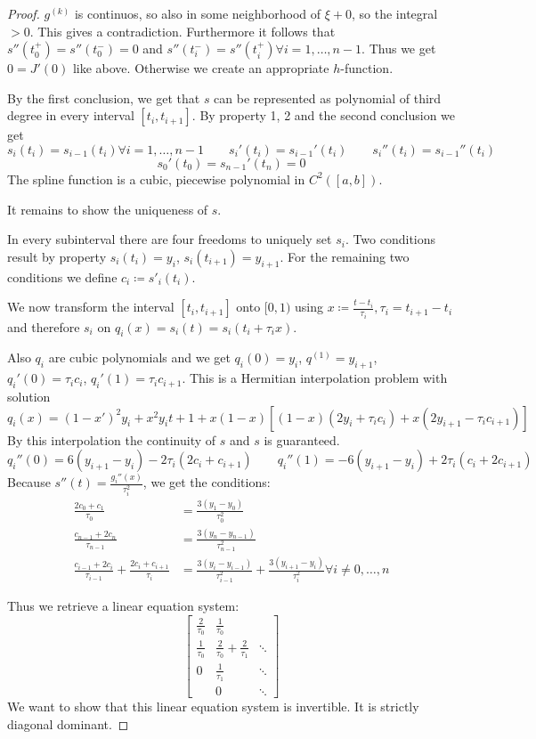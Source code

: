 \documentclass[a4paper]{article}
\numberwithin{lecref}{section}
\theoremstyle{break}
\begin{document}
\begin{proof}
  $g^{(k)}$ is continuos, so also in some neighborhood of $\xi + 0$, so the integral $> 0$. This gives a contradiction.
  Furthermore it follows that $s''(t_0^+) = s''(t_0^-) = 0$ and $s''(t_i^-) = s''(t_i^+) \forall i = 1, \dots, n-1$.
  Thus we get $0 = J'(0)$ like above. Otherwise we create an appropriate $h$-function.

  By the first conclusion, we get that $s$ can be represented as polynomial of third degree in every interval $[t_i, t_{i+1}]$. By property 1, 2 and the second conclusion we get
  \[
    s_i(t_i) = s_{i-1}(t_i) \forall i = 1, \dots, n-1 \qquad
    s_i'(t_i) = s_{i-1}'(t_i) \qquad
    s_i''(t_i) = s_{i-1}''(t_i)
  \]
  \[ s_0'(t_0) = s_{n-1}'(t_n) = 0 \]
  The spline function is a cubic, piecewise polynomial in $C^2([a, b])$.

  It remains to show the uniqueness of $s$.

  In every subinterval there are four freedoms to uniquely set $s_i$.
  Two conditions result by property $s_i(t_i) = y_i$, $s_i(t_{i+1}) = y_{i+1}$.
  For the remaining two conditions we define $c_i \coloneqq s'_i(t_i)$.

  We now transform the interval $[t_i, t_{i+1}]$ onto $[0,1)$ using $x \coloneqq \frac{t - t_i}{\tau_i}, \tau_i = t_{i + 1} - t_i$ and therefore $s_i$ on $q_i(x) = s_i(t) = s_i(t_i + \tau_i x)$.

  Also $q_i$ are cubic polynomials and we get $q_i(0) = y_i$, $q^{(1)} = y_{i+1}$, $q_i'(0) = \tau_i c_i$, $q_i'(1) = \tau_i c_{i+1}$. This is a Hermitian interpolation problem with solution
  \[ q_i(x) = (1 - x')^2 y_i + x^2 y_i t + 1 + x(1 - x) [(1 - x)(2y_i + \tau_i c_i) + x(2y_{i+1} - \tau_i c_{i+1})] \]
  By this interpolation the continuity of $s$ and $s$ is guaranteed.
  \[ q_i''(0) = 6(y_{i+1} - y_i) - 2\tau_i (2 c_i + c_{i+1}) \qquad q_i''(1) = -6(y_{i+1} - y_i) + 2\tau_i(c_i + 2 c_{i+1}) \]
  Because $s''(t) = \frac{g_i''(x)}{\tau_i^2}$, we get the conditions:
  \begin{align*}
    \frac{2c_0 + c_1}{\tau_0} &= \frac{3(y_1 - y_0)}{\tau_0^2} \\
    \frac{c_{n-1} + 2c_n}{\tau_{n-1}} &= \frac{3(y_n - y_{n-1})}{\tau_{n-1}^2} \\
    \frac{c_{i-1} + 2c_i}{\tau_{i-1}} + \frac{2c_i + c_{i+1}}{\tau_i} &= \frac{3(y_i - y_{i-1})}{\tau_{i-1}^2} + \frac{3(y_{i+1} - y_i)}{\tau_i^2} \forall i \neq 0, \dots, n
  \end{align*}

  Thus we retrieve a linear equation system:
  \[
    \begin{bmatrix}
      \frac{2}{\tau_0} & \frac{1}{\tau_0}                    & \\
      \frac{1}{\tau_0} & \frac{2}{\tau_0} + \frac{2}{\tau_1} & \ddots \\
      0                & \frac{1}{\tau_1}                    & \ddots \\
                       & 0                                   & \ddots
    \end{bmatrix}
  \]
  We want to show that this linear equation system is invertible.
  It is strictly diagonal dominant.


\end{proof}
\end{document}
